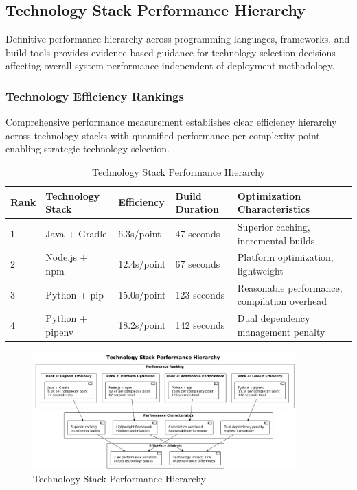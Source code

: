 \subsection{Technology Stack Performance Hierarchy}
\label{subsec:technology_hierarchy}

Definitive performance hierarchy across programming languages, frameworks, and build tools provides evidence-based guidance for technology selection decisions affecting overall system performance independent of deployment methodology.

\subsubsection{Technology Efficiency Rankings}

Comprehensive performance measurement establishes clear efficiency hierarchy across technology stacks with quantified performance per complexity point enabling strategic technology selection.

\begin{table}[H]
\centering
\caption{Technology Stack Performance Hierarchy}
\label{tab:technology_hierarchy}
\begin{tabular}{|p{1cm}|p{3cm}|p{2.5cm}|p{3cm}|p{4cm}|}
\hline
\textbf{Rank} & \textbf{Technology Stack} & \textbf{Efficiency} & \textbf{Build Duration} & \textbf{Optimization Characteristics} \\
\hline
1 & Java + Gradle & 6.3s/point & 47 seconds & Superior caching, incremental builds \\
\hline
2 & Node.js + npm & 12.4s/point & 67 seconds & Platform optimization, lightweight \\
\hline
3 & Python + pip & 15.0s/point & 123 seconds & Reasonable performance, compilation overhead \\
\hline
4 & Python + pipenv & 18.2s/point & 142 seconds & Dual dependency management penalty \\
\hline
\end{tabular}
\end{table}

\begin{figure}[H]
\centering
\includegraphics[width=0.9\textwidth]{figures/Technology-Stack-Performance-Hierarchy.png}
\caption{Technology Stack Performance Hierarchy}
\label{fig:technology-stack-hierarchy}
\end{figure}


